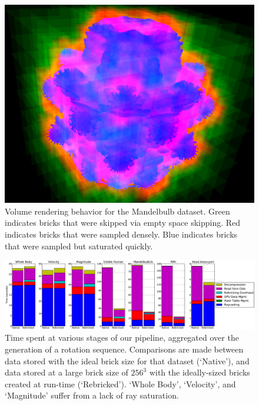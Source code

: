 \begin{figure}[t]
  \centering
  \includegraphics[width=0.95\linewidth]{images/rg/terminate-empty.png}
  \caption{Volume rendering behavior for the Mandelbulb dataset.
  Green indicates bricks that were skipped via empty space skipping.
  Red indicates bricks that were sampled densely.  Blue indicates
  bricks that were sampled but saturated quickly.
  }
  \label{fig:bricks-empty}
\end{figure}

\begin{figure}
  \centering
  \includegraphics[width=1.00\linewidth]{images/rg/breakdown.pdf}

  \caption{Time spent at various stages of our pipeline, aggregated
  over the generation of a rotation sequence.  Comparisons are made
  between data stored with the ideal brick size for that dataset
  (`Native'), and data stored at a large brick size of $256^3$ with
  the ideally-sized bricks created at run-time (`Rebricked').  `Whole
  Body', `Velocity', and `Magnitude' suffer from a lack of ray
  saturation.}

  \label{fig:breakdown}
\end{figure}

